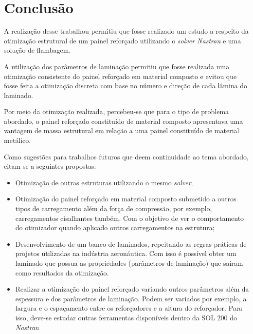 \chapter[Conclusão]{Conclusão}

A realização desse trabalhou permitiu que fosse realizado um estudo a respeito da otimização estrutural de um painel reforçado utilizando o \emph{solver Nastran} e uma solução de flambagem.

A utilização dos parâmetros de laminação permitiu que fosse realizada uma otimização consistente do painel reforçado em material composto e evitou que fosse feita a otimização discreta com base no número e direção de cada lâmina do laminado.

Por meio da otimização realizada, percebeu-se que para o tipo de problema abordado, o painel reforçado constituído de material composto apresentava uma vantagem de massa estrutural em relação a uma painel constituído de material metálico. 

Como sugestões para trabalhos futuros que deem continuidade ao tema abordado, citam-se a seguintes propostas:

\begin{itemize}
\item Otimização de outras estruturas utilizando o mesmo \emph{solver};
\item Otimização do painel reforçado em material composto submetido a outros tipos de carregamento além da força de compressão, por exemplo, carregamentos cisalhantes também. Com o objetivo de ver o comportamento do otimizador quando aplicado outros carregamentos na estrutura;
\item Desenvolvimento de um banco de laminados, repeitando as regras práticas de projetos utilizadas na indústria aeronáutica. Com isso é possível obter um laminado que possua as propriedades (parâmetros de laminação) que saíram como resultados da otimização.
\item Realizar a otimização do painel reforçado variando outros parâmetros além da espessura e dos parâmetros de laminação. Podem ser variados por exemplo, a largura e o espaçamento entre os reforçadores e a altura do reforçador. Para isso, deve-se estudar outras ferramentas disponíveis dentro da SOL 200 do \emph{Nastran}
\end{itemize}
